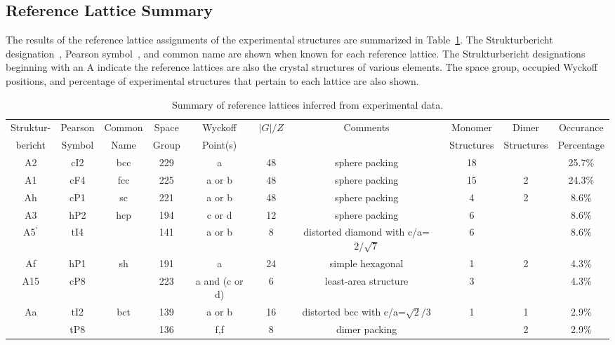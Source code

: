 \documentclass[preprint]{iucr}              %
\begin{document}
\subsection{Reference Lattice Summary}

The results of the reference lattice assignments of the experimental
structures are summarized in Table~\ref{summary}. The
Strukturbericht designation~\cite{Wilson51}, Pearson
symbol~\cite{Pearson67}, and common name are shown when known for
each reference lattice. The Strukturbericht designations beginning
with an A indicate the reference lattices are also the crystal
structures of various elements. The space group, occupied Wyckoff
positions, and percentage of experimental structures that pertain to
each lattice are also shown.
\begin{landscape}
\begin{table}
\caption{Summary of reference lattices inferred from experimental
data.} \label{summary}\scriptsize
\begin{tabular}{cccccccccc}
\hline
Struktur- & Pearson & Common & Space & Wyckoff & $|G|/Z$ & Comments & Monomer & Dimer & Occurance\\
bericht & Symbol & Name & Group & Point(s) & & & Structures & Structures & Percentage\\
\hline
A2  & cI2 & bcc & 229 & a           & 48 & sphere packing                         & 18 &   & 25.7\%\\
A1  & cF4 & fcc & 225 & a or b      & 48 & sphere packing                         & 15 & 2 & 24.3\%\\
Ah  & cP1 & sc  & 221 & a or b      & 48 & sphere packing                         &  4 & 2 & 8.6\%\\
A3  & hP2 & hcp & 194 & c or d      & 12 & sphere packing                         &  6 &   & 8.6\%\\
A5$^\prime$ & tI4 & & 141 & a or b  &  8 & distorted diamond with c/a=$2/\sqrt 7$ &  6 &   & 8.6\%\\
Af  & hP1 & sh  & 191 & a           & 24 & simple hexagonal                       &  1 & 2 & 4.3\%\\
A15 & cP8 &     & 223 & a and (c or d)&6 & least-area structure                   &  3 &   & 4.3\%\\
Aa  & tI2 & bct & 139 & a or b      & 16 & distorted bcc with c/a=$\sqrt 2/3$    &  1 & 1 & 2.9\%\\
    & tP8 &     & 136 & f,f         &  8 & dimer packing                          &    & 2 & 2.9\%\\

\end{tabular}
\end{table}
\end{landscape}
\end{document}
